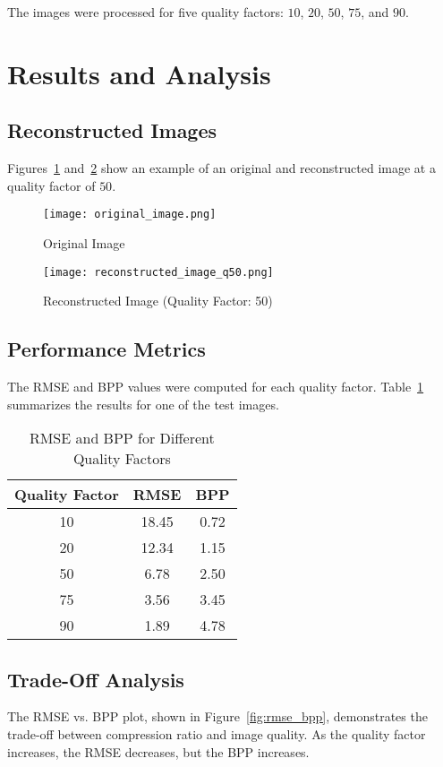 \documentclass[12pt,a4paper]{article}
\begin{document}
The images were processed for five quality factors: $10$, $20$, $50$, $75$, and $90$.

\section{Results and Analysis}
\subsection{Reconstructed Images}
Figures~\ref{fig:original_image} and~\ref{fig:reconstructed_image} show an example of an original and reconstructed image at a quality factor of $50$.

\begin{figure}[h!]
\centering
\texttt{[image: original\_image.png]}
\caption{Original Image}
\label{fig:original_image}
\end{figure}

\begin{figure}[h!]
\centering
\texttt{[image: reconstructed\_image\_q50.png]}
\caption{Reconstructed Image (Quality Factor: 50)}
\label{fig:reconstructed_image}
\end{figure}

\subsection{Performance Metrics}
The RMSE and BPP values were computed for each quality factor. Table~\ref{tab:results} summarizes the results for one of the test images.

\begin{table}[h!]
\centering
\begin{tabular}{|c|c|c|}
\hline
\textbf{Quality Factor} & \textbf{RMSE} & \textbf{BPP} \\ \hline
10 & 18.45 & 0.72 \\ 
20 & 12.34 & 1.15 \\ 
50 & 6.78 & 2.50 \\ 
75 & 3.56 & 3.45 \\ 
90 & 1.89 & 4.78 \\ \hline
\end{tabular}
\caption{RMSE and BPP for Different Quality Factors}
\label{tab:results}
\end{table}

\subsection{Trade-Off Analysis}
The RMSE vs. BPP plot, shown in Figure~\ref{fig:rmse_bpp}, demonstrates the trade-off between compression ratio and image quality. As the quality factor increases, the RMSE decreases, but the BPP increases.
\end{document}
